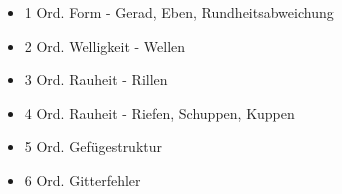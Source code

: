 \begin{itemize}
    \item 1 Ord. Form - Gerad, Eben, Rundheitsabweichung
    \item 2 Ord. Welligkeit - Wellen
    \item 3 Ord. Rauheit - Rillen
    \item 4 Ord. Rauheit - Riefen, Schuppen, Kuppen
    \item 5 Ord. Gefügestruktur
    \item 6 Ord. Gitterfehler
\end{itemize}
